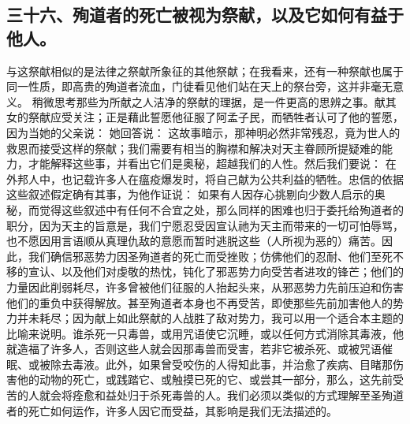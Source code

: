 
\subsection{三十六、殉道者的死亡被视为祭献，以及它如何有益于他人。}

与这祭献相似的是法律之祭献所象征的其他祭献；在我看来，还有一种祭献也属于同一性质，即高贵的殉道者流血，门徒看见他们站在天上的祭台旁，这并非毫无意义。 稍微思考那些为所献之人洁净的祭献的理据，是一件更高的思辨之事。献其女的祭献应受关注；正是藉此誓愿他征服了阿孟子民，而牺牲者认可了他的誓愿，因为当她的父亲说： 她回答说： 这故事暗示，那神明必然非常残忍，竟为世人的救恩而接受这样的祭献；我们需要有相当的胸襟和解决对天主眷顾所提疑难的能力，才能解释这些事，并看出它们是奥秘，超越我们的人性。然后我们要说： 在外邦人中，也记载许多人在瘟疫爆发时，将自己献为公共利益的牺牲。忠信的依据这些叙述假定确有其事，为他作证说： 如果有人因存心挑剔向少数人启示的奥秘，而觉得这些叙述中有任何不合宜之处，那么同样的困难也归于委托给殉道者的职分，因为天主的旨意是，我们宁愿忍受因宣认祂为天主而带来的一切可怕辱骂，也不愿因用言语顺从真理仇敌的意愿而暂时逃脱这些（人所视为恶的）痛苦。因此，我们确信邪恶势力因圣殉道者的死亡而受挫败；仿佛他们的忍耐、他们至死不移的宣认、以及他们对虔敬的热忱，钝化了邪恶势力向受苦者进攻的锋芒；他们的力量因此削弱耗尽，许多曾被他们征服的人抬起头来，从邪恶势力先前压迫和伤害他们的重负中获得解放。甚至殉道者本身也不再受苦，即使那些先前加害他人的势力并未耗尽；因为献上如此祭献的人战胜了敌对势力，我可以用一个适合本主题的比喻来说明。谁杀死一只毒兽，或用咒语使它沉睡，或以任何方式消除其毒液，他就造福了许多人，否则这些人就会因那毒兽而受害，若非它被杀死、或被咒语催眠、或被除去毒液。此外，如果曾受咬伤的人得知此事，并治愈了疾病、目睹那伤害他的动物的死亡，或践踏它、或触摸已死的它、或尝其一部分，那么，这先前受苦的人就会将痊愈和益处归于杀死毒兽的人。我们必须以类似的方式理解至圣殉道者的死亡如何运作，许多人因它而受益，其影响是我们无法描述的。\par


